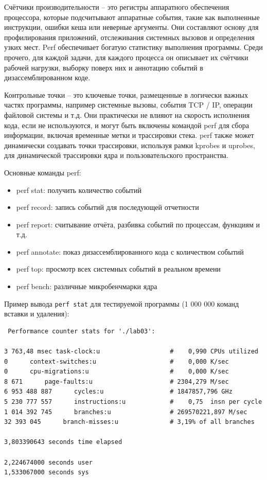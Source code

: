 \documentclass[12pt]{article}
\begin{document}
Счётчики производительности -- это регистры аппаратного обеспечения процессора, которые подсчитывают аппаратные события, такие как выполненные инструкции, ошибки кеша или неверные аргументы. Они составляют основу для профилирования приложений, отслеживания системных вызовов и определения узких мест. Perf обеспечивает богатую статистику выполнения программы. Среди прочего, для каждой задачи, для каждого процесса он описывает их счётчики рабочей нагрузки, выборку поверх них и аннотацию событий в дизассемблированном коде.

Контрольные точки -- это ключевые точки, размещенные в логически важных частях программы, например системные вызовы, события TCP / IP, операции файловой системы и т.д. 
Они практически не влияют на скорость исполнения кода, если не используются, и могут быть включены командой perf 
для сбора информации, включая временные метки и трассировки стека. perf также может динамически создавать точки трассировки, используя рамки kprobes и uprobes, для динамической трассировки ядра и пользовательского пространства.
\newline

Основные команды perf:
\begin{itemize}
\item perf stat: получить количество событий
\item perf record: запись событий для последующей отчетности
\item perf report: считывание отчёта, разбивка событий по процессам, функциям и т.д.
\item perf annotate: показ дизассемблированного кода с количеством событий
\item perf top: просмотр всех системных событий в реальном времени
\item perf bench: различные микробенчмарки ядра
\end{itemize}


Пример вывода \lstinline|perf stat| для тестируемой программы (1 000 000 команд вставки и удаления):
{ \footnotesize
\begin{lstlisting}
 Performance counter stats for './lab03':

3 763,48 msec task-clock:u                   #    0,990 CPUs utilized          
0      context-switches:u                    #    0,000 K/sec                  
0      cpu-migrations:u                      #    0,000 K/sec                  
8 671      page-faults:u                     # 2304,279 M/sec                  
6 953 488 887      cycles:u                  # 1847857,796 GHz                 
5 230 777 557      instructions:u            #    0,75  insn per cycle         
1 014 392 745      branches:u                # 269570221,897 M/sec             
32 393 045      branch-misses:u              # 3,19% of all branches        

3,803390643 seconds time elapsed

2,224674000 seconds user
1,533067000 seconds sys
\end{lstlisting}
}
\end{document}
